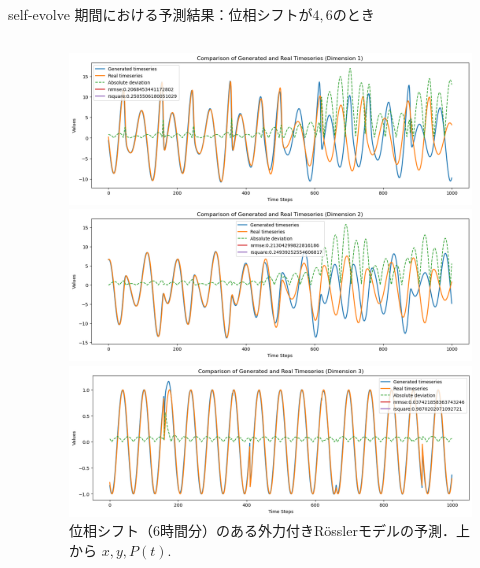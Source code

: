 \begin{frame}{self-evolve 期間における予測結果：位相シフトが$4, 6$のとき}
\begin{columns}[T]
\begin{column}{.5\textwidth}
    \end{column}
    \begin{column}{.5\textwidth}
      \begin{figure}
        \vspace{-.5cm}
        \begin{minipage}[c][.27\textheight][c]{\linewidth}
          \centering
          \includegraphics[width=0.7\linewidth]{Fig/6.x.png}
        \end{minipage}
    
        \vspace{-.5em}

        \begin{minipage}[c][.27\textheight][c]{\linewidth}
          \centering
          \includegraphics[width=0.7\linewidth]{Fig/6.y.png}
        \end{minipage}
        
        \vspace{.5em}
        \begin{minipage}[c][.27\textheight][c]{\linewidth}
          \centering
          \includegraphics[width=0.7\linewidth]{Fig/6.p.png}
          \caption{\scriptsize{位相シフト（6時間分）のある外力付きRösslerモデルの予測．上から $x, y, P(t)$.}}
        \end{minipage}
      \end{figure}
    \end{column}
  \end{columns}
\end{frame}

